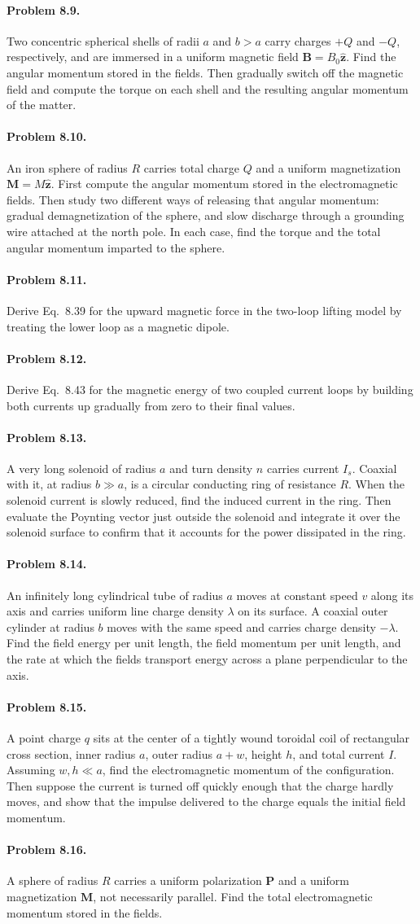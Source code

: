 \documentclass{aa}
\newcommand{\problemstatement}[2]{%
\paragraph{Problem #1.}#2\par\medskip
}
\begin{document}
\problemstatement{8.9}{Two concentric spherical shells of radii \(a\) and \(b>a\) carry charges \(+Q\) and \(-Q\), respectively, and are immersed in a uniform magnetic field \( \mathbf B=B_0\hat{\mathbf z}\). Find the angular momentum stored in the fields. Then gradually switch off the magnetic field and compute the torque on each shell and the resulting angular momentum of the matter.}
\problemstatement{8.10}{An iron sphere of radius \(R\) carries total charge \(Q\) and a uniform magnetization \( \mathbf M=M\hat{\mathbf z}\). First compute the angular momentum stored in the electromagnetic fields. Then study two different ways of releasing that angular momentum: gradual demagnetization of the sphere, and slow discharge through a grounding wire attached at the north pole. In each case, find the torque and the total angular momentum imparted to the sphere.}
\problemstatement{8.11}{Derive Eq.~8.39 for the upward magnetic force in the two-loop lifting model by treating the lower loop as a magnetic dipole.}
\problemstatement{8.12}{Derive Eq.~8.43 for the magnetic energy of two coupled current loops by building both currents up gradually from zero to their final values.}
\problemstatement{8.13}{A very long solenoid of radius \(a\) and turn density \(n\) carries current \(I_s\). Coaxial with it, at radius \(b\gg a\), is a circular conducting ring of resistance \(R\). When the solenoid current is slowly reduced, find the induced current in the ring. Then evaluate the Poynting vector just outside the solenoid and integrate it over the solenoid surface to confirm that it accounts for the power dissipated in the ring.}
\problemstatement{8.14}{An infinitely long cylindrical tube of radius \(a\) moves at constant speed \(v\) along its axis and carries uniform line charge density \(\lambda\) on its surface. A coaxial outer cylinder at radius \(b\) moves with the same speed and carries charge density \(-\lambda\). Find the field energy per unit length, the field momentum per unit length, and the rate at which the fields transport energy across a plane perpendicular to the axis.}
\problemstatement{8.15}{A point charge \(q\) sits at the center of a tightly wound toroidal coil of rectangular cross section, inner radius \(a\), outer radius \(a+w\), height \(h\), and total current \(I\). Assuming \(w,h\ll a\), find the electromagnetic momentum of the configuration. Then suppose the current is turned off quickly enough that the charge hardly moves, and show that the impulse delivered to the charge equals the initial field momentum.}
\problemstatement{8.16}{A sphere of radius \(R\) carries a uniform polarization \( \mathbf P\) and a uniform magnetization \( \mathbf M\), not necessarily parallel. Find the total electromagnetic momentum stored in the fields.}
\end{document}
